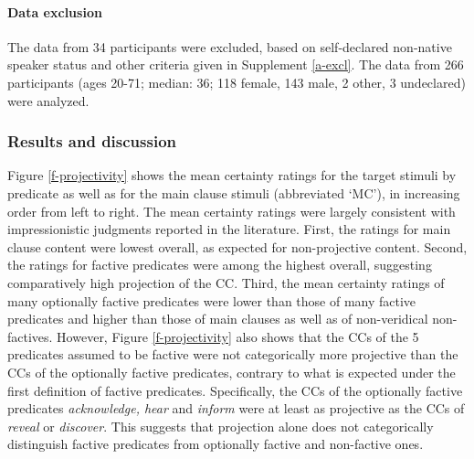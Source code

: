 \documentclass[11pt,fleqn]{article}
\newcommand{\6}{\mbox{$[\hspace*{-.6mm}[$}}
\newcommand{\9}{\mbox{$]\hspace*{-.6mm}]$}}
\begin{document}

\paragraph{Data exclusion} The data from 34 participants were excluded, based on self-declared non-native speaker status and other criteria given in Supplement \ref{a-excl}. The data from 266 participants (ages 20-71; median: 36; 118 female, 143 male, 2 other, 3 undeclared) were analyzed.

\subsubsection{Results and discussion}\label{s22}

Figure \ref{f-projectivity} shows the mean certainty ratings for the target stimuli by predicate as well as for the main clause stimuli (abbreviated `MC'), in increasing order from left to right. The mean certainty ratings were largely consistent with impressionistic judgments reported in the literature. First, the ratings for main clause content were lowest overall, as expected for non-projective content. Second, the ratings for factive predicates were among the highest overall, suggesting comparatively high projection of the CC. Third, the mean certainty ratings of many optionally factive predicates were lower than those of many factive predicates and higher than those of main clauses as well as of non-veridical non-factives. However, Figure \ref{f-projectivity} also shows that the CCs of the 5 predicates assumed to be factive were not categorically more projective than the CCs of the optionally factive predicates, contrary to what is expected under the first definition of factive predicates. Specifically, the CCs of the optionally factive predicates {\em acknowledge, hear} and {\em inform} were at least as projective as the CCs of {\em reveal} or {\em discover}. This suggests that projection alone does not categorically distinguish factive predicates from optionally factive and non-factive ones.
\end{document}
